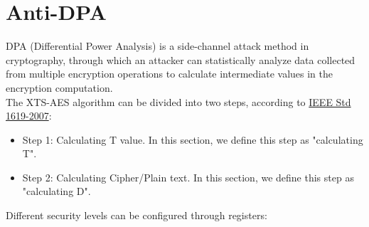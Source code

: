 \documentclass[main\_\_EN.tex]{subfiles}
\begin{document}
\section{Anti-DPA}
DPA (Differential Power Analysis) is a side-channel attack method in cryptography, through which an attacker can statistically analyze data collected from multiple encryption operations to calculate intermediate values in the encryption computation.  \\
The XTS-AES algorithm can be divided into two steps, according to \href{https://ieeexplore.ieee.org/document/4493450}{IEEE Std 1619-2007}:
\begin{itemize}
    \item Step 1: Calculating T value. In this section, we define this step as "calculating T".
    \item Step 2: Calculating Cipher/Plain text. In this section, we define this step as "calculating D".
\end{itemize}
Different security levels can be configured through registers:
\end{document}
